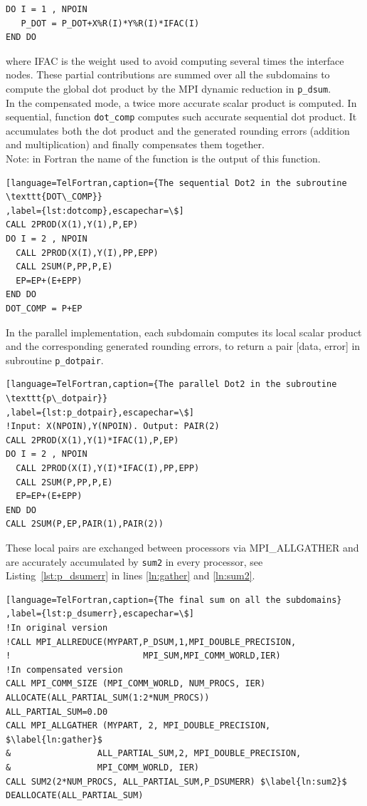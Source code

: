 \begin{lstlisting}[language=TelFortran,numbers=none,frame=none,escapechar=\$]
DO I = 1 , NPOIN
   P_DOT = P_DOT+X%R(I)*Y%R(I)*IFAC(I)
END DO
\end{lstlisting}
%
where IFAC is the weight used to avoid computing several times the interface nodes.
These partial contributions are summed over all the subdomains to compute
the global dot product by the MPI dynamic reduction in \texttt{p\_dsum}.\\
%
In the compensated mode, a twice more accurate scalar product is
computed.
In sequential, function \texttt{dot\_comp} computes such
accurate sequential dot product.
It accumulates both the dot product and the generated rounding
errors (addition and multiplication) and finally compensates them together. \\
Note: in Fortran the name of the function is the
output of this function.
\begin{lstlisting}[language=TelFortran,caption={The sequential Dot2 in the subroutine \texttt{DOT\_COMP}}
,label={lst:dotcomp},escapechar=\$]
CALL 2PROD(X(1),Y(1),P,EP)
DO I = 2 , NPOIN
  CALL 2PROD(X(I),Y(I),PP,EPP)
  CALL 2SUM(P,PP,P,E)
  EP=EP+(E+EPP)
END DO
DOT_COMP = P+EP
\end{lstlisting}
%
In the parallel implementation, each subdomain computes its
local scalar product and the corresponding generated rounding
errors, to return a pair [data, error] in subroutine \texttt{p\_dotpair}.
%
\begin{lstlisting}[language=TelFortran,caption={The parallel Dot2 in the subroutine \texttt{p\_dotpair}}
,label={lst:p_dotpair},escapechar=\$]
!Input: X(NPOIN),Y(NPOIN). Output: PAIR(2)
CALL 2PROD(X(1),Y(1)*IFAC(1),P,EP)
DO I = 2 , NPOIN
  CALL 2PROD(X(I),Y(I)*IFAC(I),PP,EPP)
  CALL 2SUM(P,PP,P,E)
  EP=EP+(E+EPP)
END DO
CALL 2SUM(P,EP,PAIR(1),PAIR(2))
\end{lstlisting}
%
These local pairs are exchanged between processors
via MPI\_ALLGATHER and are accurately accumulated by \texttt{sum2}
in every processor, see Listing~\ref{lst:p_dsumerr} in lines
\ref{ln:gather} and \ref{ln:sum2}.
%
\begin{lstlisting}[language=TelFortran,caption={The final sum on all the subdomains}
,label={lst:p_dsumerr},escapechar=\$]
!In original version
!CALL MPI_ALLREDUCE(MYPART,P_DSUM,1,MPI_DOUBLE_PRECISION,
!                          MPI_SUM,MPI_COMM_WORLD,IER)
!In compensated version
CALL MPI_COMM_SIZE (MPI_COMM_WORLD, NUM_PROCS, IER)
ALLOCATE(ALL_PARTIAL_SUM(1:2*NUM_PROCS))
ALL_PARTIAL_SUM=0.D0
CALL MPI_ALLGATHER (MYPART, 2, MPI_DOUBLE_PRECISION, $\label{ln:gather}$
&                 ALL_PARTIAL_SUM,2, MPI_DOUBLE_PRECISION,
&                 MPI_COMM_WORLD, IER)
CALL SUM2(2*NUM_PROCS, ALL_PARTIAL_SUM,P_DSUMERR) $\label{ln:sum2}$
DEALLOCATE(ALL_PARTIAL_SUM)
\end{lstlisting}
